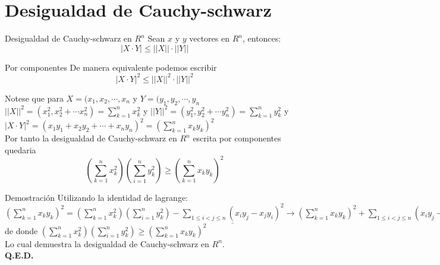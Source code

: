 \section{Desigualdad de Cauchy-schwarz}

\begin{frame}{Desigualdad de Cauchy-schwarz en $R^{n}$}
Sean $x$ y $y$ vectores en $R^{n}$, entonces: 
\begin{equation*}
    |X \cdot Y| \leq ||X|| \cdot ||Y||
\end{equation*}

\end{frame} 


\begin{frame}{Por componentes}
De manera equivalente podemos escribir 
\begin{equation*}
    |X \cdot Y|^{2} \leq ||X||^{2} \cdot ||Y||^{2}
\end{equation*}


Notese que para $X=(x_{1},x_{2}, \cdots , x_{n}$ y $Y=(y_{1},y_{2}, \cdots , y_{n}$\\ 
$||X||^{2}=(x^{2}_{1},x^{2}_{2}+ \cdots x^{2}_{n})=\sum_{k=1}^{n}x^{2}_{k}$ y $||Y||^{2}=(y^{2}_{1},y^{2}_{2}+ \cdots y^{2}_{n})=\sum_{k=1}^{n}y^{2}_{k}$ y \\
$|X \cdot Y|^{2}=(x_{1}y_{1}+x_{2}y_{2}+ \cdots + x_{n}y_{n})^{2}=(\sum_{k=1}^{n}x_{k}y_{k})^{2}$ 
\\ 
Por tanto la desigualdad de Cauchy-schwarz en $R^{n}$ escrita por componentes quedaria 
\begin{equation*}
    (\sum_{k=1}^{n} x^{2}_{k})(\sum_{i=1}^{n}y^{2}_{k}) \geq (\sum_{k=1}^{n}x_{k}y_{k})^{2}
\end{equation*}
\end{frame}

\begin{frame}{Demostración}
Utilizando la identidad de lagrange: 
$(\sum_{k=1}^{n}x_{k}y_{k})^{2} = (\sum_{k=1}^{n} x^{2}_{k})(\sum_{i=1}^{n}y^{2}_{k})- \underline{ \sum_{1\leq i<j \leq n}(x_{i}y_{j}-x_{j}y_{i})^{2}} \to (\sum_{k=1}^{n}x_{k}y_{k})^{2} + \sum_{1\leq i<j \leq n}(x_{i}y_{j}-x_{j}y_{i})^{2} = (\sum_{k=1}^{n} x^{2}_{k})(\sum_{i=1}^{n}y^{2}_{k})$ de donde $(\sum_{k=1}^{n} x^{2}_{k})(\sum_{i=1}^{n}y^{2}_{k}) \geq (\sum_{k=1}^{n}x_{k}y_{k})^{2} $\\Lo cual demuestra la desigualdad de Cauchy-schwarz en $R^{n}$. \\ 
\textbf{Q.E.D.}
\end{frame}
